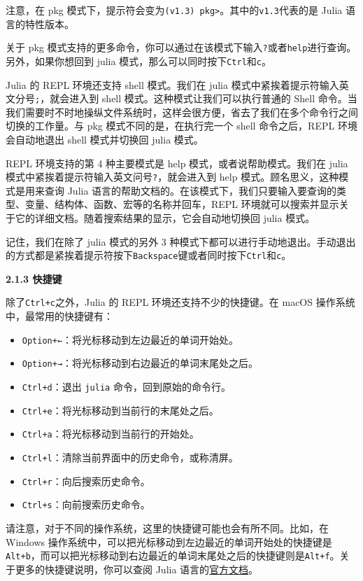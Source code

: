 注意，在 pkg 模式下，提示符会变为\verb`(v1.3) pkg>`。其中的\verb`v1.3`代表的是 Julia 语言的特性版本。

关于 pkg 模式支持的更多命令，你可以通过在该模式下输入\verb`?`或者\verb`help`进行查询。另外，如果你想回到 julia 模式，那么可以同时按下\verb`Ctrl`和\verb`c`。

Julia 的 REPL 环境还支持 shell 模式。我们在 julia 模式中紧挨着提示符输入英文分号\verb`;`，就会进入到 shell 模式。这种模式让我们可以执行普通的 Shell 命令。当我们需要时不时地操纵文件系统时，这样会很方便，省去了我们在多个命令行之间切换的工作量。与 pkg 模式不同的是，在执行完一个 shell 命令之后，REPL 环境会自动地退出 shell 模式并切换回 julia 模式。

REPL 环境支持的第 4 种主要模式是 help 模式，或者说帮助模式。我们在 julia 模式中紧挨着提示符输入英文问号\verb`?`，就会进入到 help 模式。顾名思义，这种模式是用来查询 Julia 语言的帮助文档的。在该模式下，我们只要输入要查询的类型、变量、结构体、函数、宏等的名称并回车，REPL 环境就可以搜索并显示关于它的详细文档。随着搜索结果的显示，它会自动地切换回 julia 模式。

记住，我们在除了 julia 模式的另外 3 种模式下都可以进行手动地退出。手动退出的方式都是紧挨着提示符按下\verb`Backspace`键或者同时按下\verb`Ctrl`和\verb`c`。

\textbf{2.1.3 快捷键}

除了\verb`Ctrl+c`之外，Julia 的 REPL 环境还支持不少的快捷键。在 macOS 操作系统中，最常用的快捷键有：

\begin{itemize}
\item \verb`Option+←`：将光标移动到左边最近的单词开始处。
\item  \verb`Option+→`：将光标移动到右边最近的单词末尾处之后。
\item  \verb`Ctrl+d`：退出 \verb`julia` 命令，回到原始的命令行。
\item  \verb`Ctrl+e`：将光标移动到当前行的末尾处之后。
\item  \verb`Ctrl+a`：将光标移动到当前行的开始处。
\item  \verb`Ctrl+l`：清除当前界面中的历史命令，或称清屏。
\item  \verb`Ctrl+r`：向后搜索历史命令。
\item  \verb`Ctrl+s`：向前搜索历史命令。
\end{itemize}

请注意，对于不同的操作系统，这里的快捷键可能也会有所不同。比如，在 Windows 操作系统中，可以把光标移动到左边最近的单词开始处的快捷键是\verb`Alt+b`，而可以把光标移动到右边最近的单词末尾处之后的快捷键则是\verb`Alt+f`。关于更多的快捷键说明，你可以查阅 Julia 语言的\href{https://docs.julialang.org/en/v1/stdlib/REPL/#Key-bindings-1}{官方文档}。

